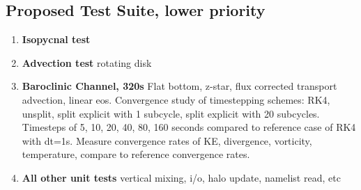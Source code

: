 \documentclass[11pt,titlepage,twoside]{article}
\begin{document}
\subsection{Proposed Test Suite, lower priority}
\begin{enumerate}
\item {\bf Isopycnal test} 
\item {\bf Advection test} rotating disk
\item {\bf Baroclinic Channel, 320s} Flat bottom, z-star, flux corrected transport advection, linear eos.  Convergence study of timestepping schemes: RK4, unsplit, split explicit with 1 subcycle, split explicit with 20 subcycles.  Timesteps of 5, 10, 20, 40, 80, 160 seconds compared to reference case of RK4 with dt=1s.  Measure convergence rates of KE, divergence, vorticity, temperature, compare to reference convergence rates.
\item {\bf All other unit tests} vertical mixing, i/o, halo update, namelist read, etc
\end{enumerate}
\end{document}
